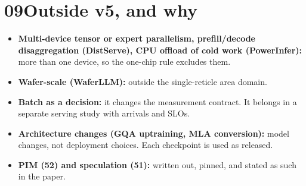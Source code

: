 \documentclass[10pt]{article}
\renewcommand{\_}{\textunderscore\allowbreak}
\begin{document}
   
\section*{09\quad Outside v5, and why}
 
\begin{itemize}
 \item \textbf{Multi-device tensor or expert parallelism, prefill/decode disaggregation (DistServe), CPU offload of cold work (PowerInfer):} more than one device, so the one-chip rule excludes them.
 \item \textbf{Wafer-scale (WaferLLM):} outside the single-reticle area domain.
 \item \textbf{Batch as a decision:} it changes the measurement contract. It belongs in a separate serving study with arrivals and SLOs.
 \item \textbf{Architecture changes (GQA uptraining, MLA conversion):} model changes, not deployment choices. Each checkpoint is used as released.
 \item \textbf{PIM (52) and speculation (51):} written out, pinned, and stated as such in the paper.
 
\end{itemize}
    
\end{document}
